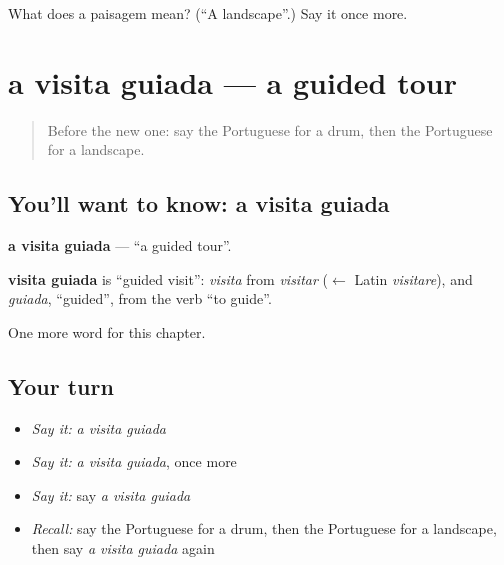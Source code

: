 \begin{tcolorbox}[breakable,colback=teal!4,colframe=teal!35!black,title={Before you move on}]
What does a paisagem mean? (\textquotedblleft{}A landscape\textquotedblright{}.) Say it once more.
\end{tcolorbox}
\section[a visita guiada]{a visita guiada — a guided tour}

\label{lesson:PT-C197-visita-guiada}



\begin{quote}
Before the new one: say the Portuguese for a drum, then the Portuguese for a landscape.
\end{quote}

\subsection*{You'll want to know: a visita guiada}
\textbf{a visita guiada} — \textquotedblleft{}a guided tour\textquotedblright{}.

\begin{cousinweb}
\textbf{visita guiada} is \textquotedblleft{}guided visit\textquotedblright{}: \emph{visita} from \emph{visitar} ($\leftarrow$ Latin \emph{visitare}), and \emph{guiada}, \textquotedblleft{}guided\textquotedblright{}, from the verb \textquotedblleft{}to guide\textquotedblright{}.
\end{cousinweb}

\begin{grammarlens}[title={What you've built}]
One more word for this chapter.
\end{grammarlens}

\subsection*{Your turn}
\begin{itemize}
\raggedright
  \item \emph{Say it:} \emph{a visita guiada}
  \item \emph{Say it:} \emph{a visita guiada}, once more
  \item \emph{Say it:} say \emph{a visita guiada}
  \item \emph{Recall:} say the Portuguese for a drum, then the Portuguese for a landscape, then say \emph{a visita guiada} again
\end{itemize}

